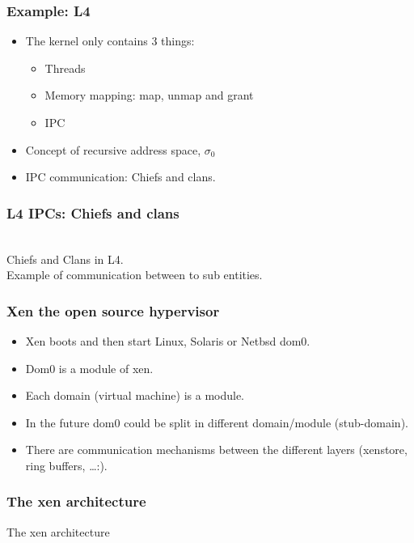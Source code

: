 \begin{frame}
  \frametitle{Example: L4}
  \begin{itemize}
        \item The kernel only contains 3 things:
        \begin{itemize}
                \item Threads
                \item Memory mapping: map, unmap and grant
                \item IPC
        \end{itemize}
        \item Concept of recursive address space, $\sigma{}_0$ 
        \item IPC communication: Chiefs and clans.
  \end{itemize}
\end{frame}
\begin{frame}
  \frametitle{L4 IPCs: Chiefs and clans}
  \begin{center}
   \\
  Chiefs and Clans in L4. \\ Example of communication between to sub entities.
  \end{center}
\end{frame}

\begin{frame}
        \frametitle{Xen the open source hypervisor}
        \begin{itemize}
                \item Xen boots and then start Linux, Solaris or Netbsd dom0.
                \item Dom0 is a module of xen.
                \item Each domain (virtual machine) is a module.
                \item In the future dom0 could be split in different domain/module (stub-domain).
                \item There are communication mechanisms between the different layers (xenstore, ring buffers, \ldots:).
        \end{itemize}
\end{frame}
\begin{frame}
\frametitle{The xen architecture}
\begin{center}


The xen architecture

\end{center}
\end{frame}

